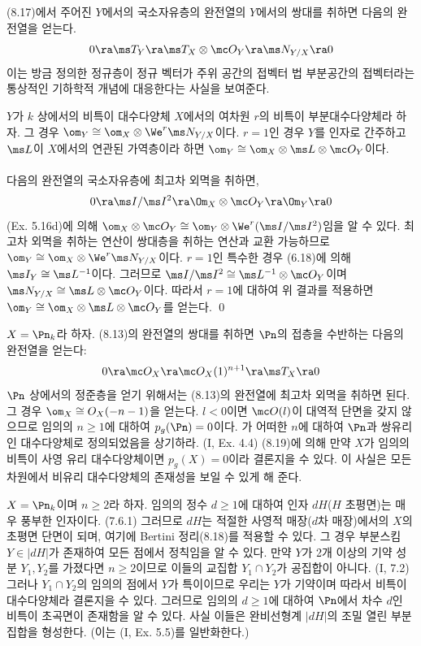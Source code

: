 	(8.17)에서 주어진 $Y$에서의 국소자유층의 완전열의 $Y$에서의 쌍대를 취하면 다음의 완전열을 얻는다.
	$$0\ra\ms T_Y\ra\ms T_X\otimes\mc O_Y\ra\ms N_{Y/X}\ra 0$$
	이는 방금 정의한 정규층이 정규 벡터가 주위 공간의 접벡터 법 부분공간의 접벡터라는 통상적인 기하학적 개념에 대응한다는 사실을 보여준다.
	
	
	\begin{proposition}
	$Y$가 $k$ 상에서의 비특이 대수다양체 $X$에서의 여차원 $r$의 비특이 부분대수다양체라 하자.
	그 경우 $\om_Y\cong\om_X\otimes\We^r\ms N_{Y/X}$이다.
	$r=1$인 경우 $Y$를 인자로 간주하고 $\ms L$이 $X$에서의 연관된 가역층이라 하면 $\om_Y\cong\om_X\otimes\ms L\otimes\mc O_Y$이다.\\\\
	\pf 다음의 완전열의 국소자유층에 최고차 외멱을 취하면,
	$$0\ra\ms I/\ms I^2\ra\Om_X\otimes\mc O_Y\ra\Om_Y\ra 0$$
	(Ex. 5.16d)에 의해 $\om_X\otimes\mc O_Y\cong\om_Y\otimes\We^r(\ms I/\ms I^2)$임을 알 수 있다.
	최고차 외멱을 취하는 연산이 쌍대층을 취하는 연산과 교환 가능하므로 $\om_Y\cong\om_X\otimes\We^r\ms N_{Y/X}$이다.
	$r=1$인 특수한 경우 (6.18)에 의해 $\ms I_Y\cong\ms L^{-1}$이다.
	그러므로 $\ms I/\ms I^2\cong\ms L^{-1}\otimes\mc O_Y$이며 $\ms N_{Y/X}\cong\ms L\otimes\mc O_Y$이다.
	따라서 $r=1$에 대하여 위 결과를 적용하면 $\om_Y\cong\om_X\otimes\ms L\otimes\mc O_Y$를 얻는다.
	\qed
	\end{proposition}
	
	
	\begin{example}
	$X=\Pn_k$라 하자. (8.13)의 완전열의 쌍대를 취하면 $\Pn$의 접층을 수반하는 다음의 완전열을 얻는다:
	$$0\ra\mc O_X\ra\mc O_X(1)^{n+1}\ra\ms T_X\ra 0$$
	$\Pn$ 상에서의 정준층을 얻기 위해서는 (8.13)의 완전열에 최고차 외멱을 취하면 된다. 그 경우 $\om_X\cong O_X(-n-1)$을 얻는다.
	$l<0$이면 $\mc O(l)$이 대역적 단면을 갖지 않으므로 임의의 $n\ge 1$에 대하여 $p_g(\Pn)=0$이다.
	가 어떠한 $n$에 대하여 $\Pn$과 쌍유리인 대수다양체로 정의되었음을 상기하라. (I, Ex. 4.4)
	(8.19)에 의해 만약 $X$가 임의의 비특이 사영 유리 대수다양체이면 $p_g(X)=0$이라 결론지을 수 있다.
	이 사실은 모든 차원에서 비유리 대수다양체의 존재성을 보일 수 있게 해 준다.
	\end{example}
	
	
	\begin{example}
	$X=\Pn_k$이며 $n\ge 2$라 하자. 임의의 정수 $d\ge 1$에 대하여 인자 $dH$($H$ 초평면)는 매우 풍부한 인자이다. (7.6.1)
	그러므로 $dH$는 적절한 사영적 매장($d$차 매장)에서의 $X$의 초평면 단면이 되며, 여기에 Bertini 정리(8.18)를 적용할 수 있다.
	그 경우 부분스킴 $Y\in|dH|$가 존재하여 모든 점에서 정칙임을 알 수 있다.
	만약 $Y$가 2개 이상의 기약 성분 $Y_1,Y_2$를 가졌다면 $n\ge 2$이므로 이들의 교집합 $Y_1\cap Y_2$가 공집합이 아니다. (I, 7.2)
	그러나 $Y_1\cap Y_2$의 임의의 점에서 $Y$가 특이이므로 우리는 $Y$가 기약이며 따라서 비특이 대수다양체라 결론지을 수 있다.
	그러므로 임의의 $d\ge 1$에 대하여 $\Pn$에서 차수 $d$인 비특이 초곡면이 존재함을 알 수 있다.
	사실 이들은 완비선형계 $|dH|$의 조밀 열린 부분집합을 형성한다. (이는 (I, Ex. 5.5)를 일반화한다.)
	\end{example}
	

